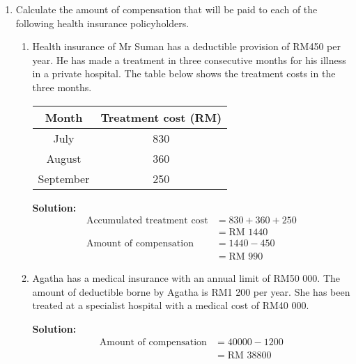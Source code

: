 \documentclass{report}
\newcommand{\sol}{

    \vspace{0.5em}\textbf{Solution:}\vspace{0.5em}}
\begin{document}
\begin{enumerate}
    \item Calculate the amount of compensation that will be paid to each of the following
          health insurance policyholders.
          \begin{enumerate}
              \item Health insurance of Mr Suman has a deductible provision of RM450 per year. He
                    has made a treatment in three consecutive months for his illness in a private
                    hospital. The table below shows the treatment costs in the three months.

                    \begin{tabular}{|c|c|}
                        \hline Month     & Treatment cost (RM) \\
                        \hline July      & 830                 \\
                        \hline August    & 360                 \\
                        \hline September & 250                 \\
                        \hline
                    \end{tabular}
                    \sol{}
                    \begin{align*}
                        \text{Accumulated treatment cost} & = 830 + 360 + 250  \\
                                                          & = \text{RM } 1 440 \\
                        \text{Amount of compensation}     & = 1 440 - 450      \\
                                                          & = \text{RM } 990
                    \end{align*}
              \item Agatha has a medical insurance with an annual limit of RM50 000. The amount of
                    deductible borne by Agatha is RM1 200 per year. She has been treated at a
                    specialist hospital with a medical cost of RM40 000. \sol{}
                    \begin{align*}
                        \text{Amount of compensation} & = 40 000 - 1 200    \\
                                                      & = \text{RM } 38 800
                    \end{align*}

          \end{enumerate}
          \vfill\null


\end{enumerate}
\end{document}
